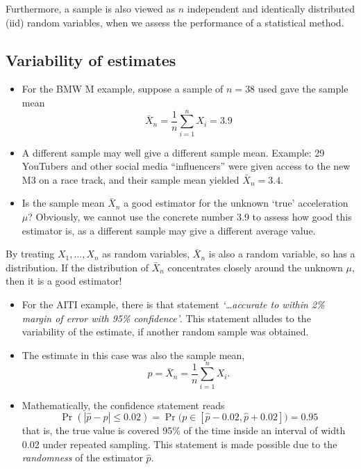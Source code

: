 \documentclass[
]{book}
\theoremstyle{definition}
\theoremstyle{definition}
\theoremstyle{definition}
\theoremstyle{definition}
\theoremstyle{remark}
\begin{document}
Furthermore, a sample is also viewed as \(n\) independent and identically
distributed (iid) random variables, when we assess the performance of a
statistical method.

\hypertarget{variability-of-estimates}{%
\subsection*{Variability of estimates}\label{variability-of-estimates}}

\begin{itemize}
\item
  For the BMW M example, suppose a sample of \(n=38\) used gave the sample mean
  \[\bar X_n = \frac{1}{n}\sum_{i=1}^n X_i = 3.9\]
\item
  A different sample may well give a different sample mean.
  Example: 29 YouTubers and other social media ``influencers'' were given access to the new M3 on a race track, and their sample mean yielded \(\bar X_n = 3.4\).
\item
  Is the sample mean \(\bar X_n\) a good estimator for the unknown
  `true' acceleration \(\mu\)? Obviously, we cannot use the concrete number
  3.9 to assess how good this estimator is, as a different sample may
  give a different average value.
\end{itemize}

By treating \(X_1,\dots,X_n\) as random variables, \(\bar X_n\) is
also a random variable, so has a distribution. If the distribution of
\(\bar X_n\) concentrates closely around the unknown \(\mu\), then it is a
good estimator!

\begin{itemize}
\item
  For the AITI example, there is that statement \emph{`\ldots accurate to within 2\% margin of error with 95\% confidence'}. This statement alludes to the variability of the estimate, if another random sample was obtained.
\item
  The estimate in this case was also the sample mean,
  \[
  \hat p = \bar X_n = \frac{1}{n}\sum_{i=1}^n X_i.
  \]
\item
  Mathematically, the confidence statement reads
  \[
  \Pr(|\hat p - p| \leq 0.02 ) = \Pr\big(p\in [\hat p-0.02, \hat p + 0.02]\big) = 0.95
  \]
  that is, the true value is covered 95\% of the time inside an interval of width 0.02 under repeated sampling. This statement is made possible due to the \emph{randomness} of the estimator \(\hat p\).
\end{itemize}
\end{document}
